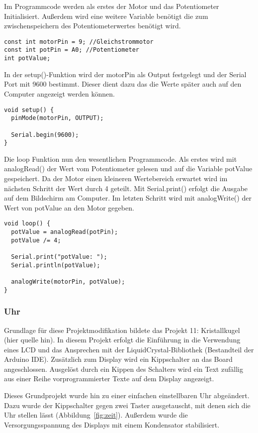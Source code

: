 Im Programmcode werden als erstes der Motor und das Potentiometer Initialisiert. Außerdem wird eine weitere Variable benötigt die zum zwischenspeichern des Potentiometerwertes benötigt wird.
\begin{lstlisting}[language=Arduino]
const int motorPin = 9; //Gleichstrommotor
const int potPin = A0; //Potentiometer
int potValue;
\end{lstlisting}

In der setup()-Funktion wird der motorPin als Output festgelegt und der Serial Port mit 9600 bestimmt. Dieser dient dazu das die Werte später auch auf den Computer angezeigt werden können.
\begin{lstlisting}[language=Arduino]
void setup() {
  pinMode(motorPin, OUTPUT);

  Serial.begin(9600);
}
\end{lstlisting}

Die loop Funktion nun den wesentlichen Programmcode. Als erstes wird mit analogRead() der Wert vom Potentiometer gelesen und auf die Variable potValue gespeichert. Da der Motor einen kleineren Wertebereich erwartet wird im nächsten Schritt der Wert durch 4 geteilt. Mit Serial.print() erfolgt die Ausgabe auf dem Bildschirm am Computer. Im letzten Schritt wird mit analogWrite() der Wert von potValue an den Motor gegeben.
\begin{lstlisting}[language=Arduino]
void loop() {
  potValue = analogRead(potPin);
  potValue /= 4;

  Serial.print("potValue: ");
  Serial.println(potValue);

  analogWrite(motorPin, potValue);
}
\end{lstlisting}



\subsubsection{Uhr}
Grundlage für diese Projektmodifikation bildete das Projekt 11: Kristallkugel (hier quelle hin). In diesem Projekt erfolgt die Einführung in die Verwendung eines LCD und das Ansprechen mit der LiquidCrystal-Bibliothek (Bestandteil der Arduino IDE).
Zusätzlich zum Display wird ein Kippschalter an das Board angeschlossen. Ausgelöst durch ein Kippen des Schalters wird ein Text zufällig aus einer Reihe vorprogrammierter Texte auf dem Display angezeigt.

Dieses Grundprojekt wurde hin zu einer einfachen einstellbaren Uhr abgeändert. Dazu wurde der Kippschalter gegen zwei Taster ausgetauscht, mit denen sich die Uhr stellen lässt (Abbildung~\ref{fig:zeit}). Außerdem wurde die Versorgungsspannung des Displays mit einem Kondensator stabilisiert.

